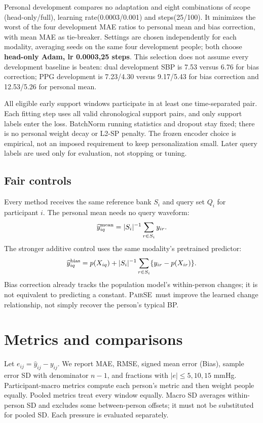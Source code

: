 \documentclass[conference]{IEEEtran}
\newcommand{\pair}{\textsc{PairSE}}
\begin{document}
Personal development compares no adaptation and eight combinations of scope
(head-only/full), learning rate(0.0003/0.001) and steps(25/100). It minimizes
the worst of the four development MAE ratios to personal mean and bias
correction, with mean MAE as tie-breaker. Settings are chosen independently
for each modality, averaging seeds on the same four development people;
both choose \textbf{head-only Adam, lr 0.0003,25 steps}. This selection does
not assume every development baseline is beaten: dual development SBP is
7.53 versus 6.76 for bias correction; PPG development is 7.23/4.30 versus
9.17/5.43 for bias correction and 12.53/5.26 for personal mean.

All eligible early support windows participate in at least one time-separated
pair. Each fitting step uses all valid chronological support pairs, and only
support labels enter the loss. BatchNorm running statistics and dropout stay
fixed; there is no personal weight decay or L2-SP penalty. The frozen encoder
choice is empirical, not an imposed requirement to keep personalization small.
Later query labels are used only for evaluation, not stopping or tuning.

\subsection{Fair controls}
Every method receives the same reference bank $S_i$ and query set $Q_i$ for
participant $i$. The personal mean needs no query waveform:
\begin{equation}
 \widehat y^{\rm mean}_{iq}=|S_i|^{-1}\sum_{r\in S_i}y_{ir}.
\end{equation}
The stronger additive control uses the same modality's pretrained predictor:
\begin{equation}
 \widehat y^{\rm bias}_{iq}=p(X_{iq})+
 |S_i|^{-1}\sum_{r\in S_i}\{y_{ir}-p(X_{ir})\}.
\end{equation}
Bias correction already tracks the population model's within-person changes;
it is not equivalent to predicting a constant. \pair\ must improve the learned
change relationship, not simply recover the person's typical BP.

\section{Metrics and comparisons}
Let $e_{ij}=\widehat y_{ij}-y_{ij}$. We report MAE, RMSE, signed mean error
(Bias), sample error SD with denominator $n-1$, and fractions with
$|e|\leq5,10,15$ mmHg. Participant-macro metrics compute each person's metric
and then weight people equally. Pooled metrics treat every window equally.
Macro SD averages within-person SD and excludes some between-person offsets;
it must not be substituted for pooled SD. Each pressure is evaluated separately.
\end{document}
